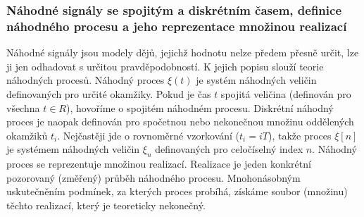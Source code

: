     \subsubsection{Náhodné signály se spojitým a diskrétním časem, definice náhodného procesu a jeho reprezentace množinou realizací} Náhodné signály jsou modely dějů, jejichž hodnotu nelze předem přesně určit, lze ji jen odhadovat s určitou pravděpodobností. K jejich popisu slouží teorie náhodných procesů. Náhodný proces $\xi(t)$ je systém náhodných veličin definovaných pro určité okamžiky. Pokud je čas $t$ spojitá veličina (definován pro všechna $t \in {R}$), hovoříme o spojitém náhodném procesu. Diskrétní náhodný proces je naopak definován pro spočetnou nebo nekonečnou množinu oddělených okamžiků $t_i$. Nejčastěji jde o rovnoměrné vzorkování ($t_i = iT$), takže proces $\xi[n]$ je systémem náhodných veličin $\xi_n$ definovaných pro celočíselný index $n$. Náhodný proces se reprezentuje množinou realizací. Realizace je jeden konkrétní pozorovaný (změřený) průběh náhodného procesu. Mnohonásobným uskutečněním podmínek, za kterých proces probíhá, získáme soubor (množinu) těchto realizací, který je teoreticky nekonečný.

